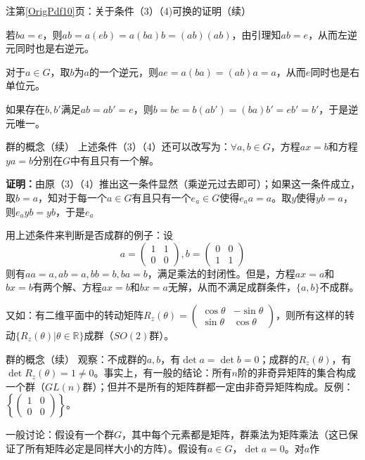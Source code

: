 \documentclass{beamer}
\newcommand{\refpage}[1]{第\ref{OrigPdf#1}页}%
\begin{document}
\begin{frame}{注\refpage{10}：关于条件（3）（4)可换的证明（续）}
	
	若$ba=e$，则$ab=a(eb)=a(ba)b=(ab)(ab)$，由引理知$ab=e$，从而左逆元同时也是右逆元。
	
	对于$a\in G$，取$b$为$a$的一个逆元，则$ae=a(ba)=(ab)a=a$，从而$e$同时也是右单位元。
	
	如果存在$b,b'$满足$ab=ab'=e$，则$b=be=b(ab')=(ba)b'=eb'=b'$，于是逆元唯一。\qedsymbol
	
\end{frame}

\begin{frame}{群的概念（续）}
上述条件（3）（4）还可以改写为：$\forall a,b\in G$，方程$ax=b$和方程$ya=b$分别在$G$中有且只有一个解。

\textbf{证明：}由原（3）（4）推出这一条件显然（乘逆元过去即可）；如果这一条件成立，取$b=a$，知对于每一个$a\in G$有且只有一个$e_a\in G$使得$e_aa=a$。取$y$使得$yb=a$，则$e_ayb=yb$，于是$e_a$\qedsymbol

用上述条件来判断是否成群的例子：设
\begin{equation*}
a=\begin{pmatrix}1 & 1 \\ 0 & 0\end{pmatrix}, b=\begin{pmatrix}0 & 0 \\ 1 & 1\end{pmatrix}
\end{equation*}
则有$aa=a,ab=a,bb=b,ba=b$，满足乘法的封闭性。但是，方程$ax=a$和$bx=b$有两个解、方程$ax=b$和$bx=a$无解，从而不满足成群条件，$\{a,b\}$不成群。

又如：有二维平面中的转动矩阵$R_z(\theta)=\begin{pmatrix}\cos\theta & -\sin\theta \\ \sin\theta & \cos\theta\end{pmatrix}$，则所有这样的转动$\{R_z(\theta)|\theta\in\mathbb{R}\}$成群（$SO(2)$群）。
\end{frame}

\begin{frame}{群的概念（续）}
观察：不成群的$a,b$，有$\det a=\det b=0$；成群的$R_z(\theta)$，有$\det R_z(\theta)=1\neq 0$。事实上，有一般的结论：所有$n$阶的非奇异矩阵的集合构成一个群（$GL(n)$群）；但并不是所有的矩阵群都一定由非奇异矩阵构成。反例：$\left\{\begin{pmatrix}1 & 0 \\ 0 & 0\end{pmatrix}\right\}$。

一般讨论：假设有一个群$G$，其中每个元素都是矩阵，群乘法为矩阵乘法（这已保证了所有矩阵必定是同样大小的方阵）。假设有$a\in G$，$\det a=0$。对$a$作
\end{frame}
\end{document}
